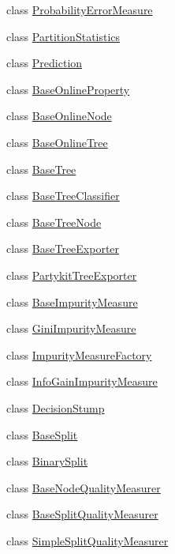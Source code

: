 \begin{DoxyCompactItemize}
\item 
class \hyperlink{classffactory_1_1_probability_error_measure}{Probability\-Error\-Measure}
\item 
class \hyperlink{classffactory_1_1_partition_statistics}{Partition\-Statistics}
\item 
class \hyperlink{classffactory_1_1_prediction}{Prediction}
\item 
class \hyperlink{classffactory_1_1_base_online_property}{Base\-Online\-Property}
\item 
class \hyperlink{classffactory_1_1_base_online_node}{Base\-Online\-Node}
\item 
class \hyperlink{classffactory_1_1_base_online_tree}{Base\-Online\-Tree}
\item 
class \hyperlink{classffactory_1_1_base_tree}{Base\-Tree}
\item 
class \hyperlink{classffactory_1_1_base_tree_classifier}{Base\-Tree\-Classifier}
\item 
class \hyperlink{classffactory_1_1_base_tree_node}{Base\-Tree\-Node}
\item 
class \hyperlink{classffactory_1_1_base_tree_exporter}{Base\-Tree\-Exporter}
\item 
class \hyperlink{classffactory_1_1_partykit_tree_exporter}{Partykit\-Tree\-Exporter}
\item 
class \hyperlink{classffactory_1_1_base_impurity_measure}{Base\-Impurity\-Measure}
\item 
class \hyperlink{classffactory_1_1_gini_impurity_measure}{Gini\-Impurity\-Measure}
\item 
class \hyperlink{classffactory_1_1_impurity_measure_factory}{Impurity\-Measure\-Factory}
\item 
class \hyperlink{classffactory_1_1_info_gain_impurity_measure}{Info\-Gain\-Impurity\-Measure}
\item 
class \hyperlink{classffactory_1_1_decision_stump}{Decision\-Stump}
\item 
class \hyperlink{classffactory_1_1_base_split}{Base\-Split}
\item 
class \hyperlink{classffactory_1_1_binary_split}{Binary\-Split}
\item 
class \hyperlink{classffactory_1_1_base_node_quality_measurer}{Base\-Node\-Quality\-Measurer}
\item 
class \hyperlink{classffactory_1_1_base_split_quality_measurer}{Base\-Split\-Quality\-Measurer}
\item 
class \hyperlink{classffactory_1_1_simple_split_quality_measurer}{Simple\-Split\-Quality\-Measurer}

\end{DoxyCompactItemize}
